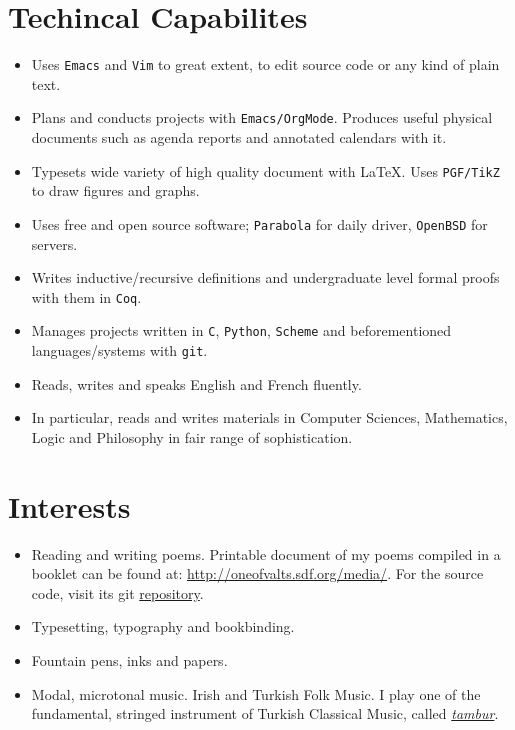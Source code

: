 \documentclass[11pt, a4paper, twocolumn]{memoir}
\begin{document}
\section*{Techincal Capabilites}
\begin{itemize}[leftmargin=*]
  \item Uses \texttt{Emacs} and \texttt{Vim} to great extent, to edit
  source code or any kind of plain text.
  \item Plans and conducts projects with \texttt{Emacs/OrgMode}.
  Produces useful physical documents such as agenda reports and
  annotated calendars with it.
  \item Typesets wide variety of high quality document with \LaTeX. Uses
  \texttt{PGF/TikZ} to draw figures and graphs.
  \item Uses free and open source software; \texttt{Parabola} for daily
  driver, \texttt{OpenBSD} for servers.
  \item Writes inductive/recursive definitions and undergraduate level
  formal proofs with them in \texttt{Coq}.
  \item Manages projects written in \texttt{C}, \texttt{Python},
  \texttt{Scheme} and beforementioned languages/systems with
  \texttt{git}.
  \item Reads, writes and speaks English and French fluently.
  \item In particular, reads and writes materials in Computer Sciences,
  Mathematics, Logic and Philosophy in fair range of sophistication.
\end{itemize}
\section*{Interests}
\begin{itemize}[leftmargin=*]
  \item Reading and writing poems. Printable document of my poems compiled in a
  booklet can be found at: \url{http://oneofvalts.sdf.org/media/}. For the
  source code, visit its git
  \href{https://github.com/oneofvalts/usavurdu}{repository}.
  \item Typesetting, typography and bookbinding.
  \item Fountain pens, inks and papers.
  \item Modal, microtonal music. Irish and Turkish Folk Music. I play one
  of the fundamental, stringed instrument of Turkish Classical Music,
  called
  \href{https://en.wikipedia.org/wiki/Turkish_tambur}{\textit{tambur}}.
\end{itemize}
\end{document}
